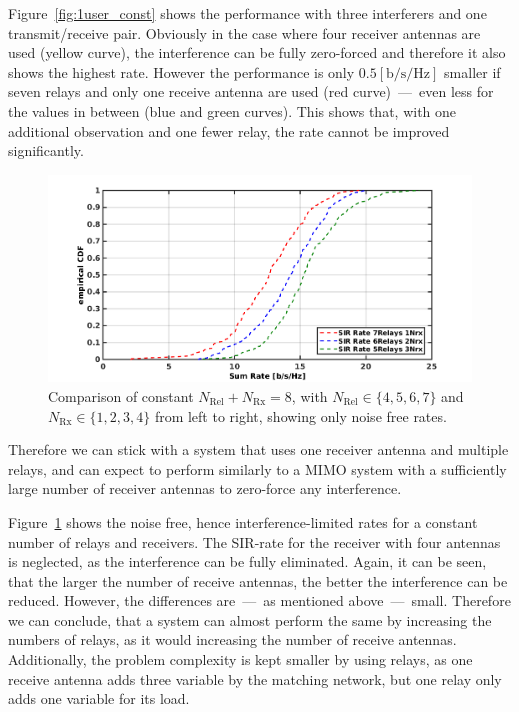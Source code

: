 Figure~\ref{fig:1user_const} shows the performance with three interferers and one transmit/receive pair.
Obviously in the case where four receiver antennas are used (yellow curve), the interference can be fully zero-forced and therefore it also shows the highest rate.
However the performance is only $0.5 \left[\text{b/s/Hz}\right]$ smaller if seven relays and only one receive antenna are used (red curve)~---~even less for the values in between (blue and green curves).
This shows that, with one additional observation and one fewer relay, the rate cannot be improved significantly.
\begin{figure}[h]
\centering
  \includegraphics[width=0.9\linewidth]{images/ConstNrelNrx8comparison_1Rx_onlySIR.png}
\caption{Comparison of constant $N_\text{Rel} + N_{\text{Rx}} = 8$, with $N_\text{Rel}\in\{4,5,6,7\}$ and $N_{\text{Rx}}\in\{1,2,3,4\}$ from left to right, showing only noise free rates.}
\label{fig:1user_const_SIR}
\end{figure}
Therefore we can stick with a system that uses one receiver antenna and multiple relays, and can expect to perform similarly to a MIMO system with a sufficiently large number of receiver antennas to zero-force any interference.

Figure~\ref{fig:1user_const_SIR} shows the noise free, hence interference-limited rates for a constant number of relays and receivers.
The SIR-rate for the receiver with four antennas is neglected, as the interference can be fully eliminated.
Again, it can be seen, that the larger the number of receive antennas, the better the interference can be reduced.
However, the differences are~---~as mentioned above~---~small.
Therefore we can conclude, that a system can almost perform the same by increasing the numbers of relays, as it would increasing the number of receive antennas.
Additionally, the problem complexity is kept smaller by using relays, as one receive antenna adds three variable by the matching network, but one relay only adds one variable for its load.

